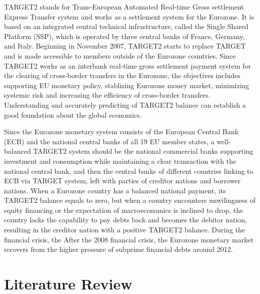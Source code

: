\documentclass[12pt]{article}
\begin{document}
TARGET2 stands for Trans-European Automated Real-time Gross settlement Express Transfer system and works as a settlement system for the Eurozone. It is based on an integrated central technical infrastructure, called the Single Shared Platform (SSP), which is operated by three central banks of France, Germany, and Italy. Beginning in November 2007, TARGET2 starts to replace TARGET and is made accessible to members outside of the Eurozone countries. Since TARGET2 works as an interbank real-time gross settlement payment system for the clearing of cross-border transfers in the Eurozone, the objectives includes supporting EU monetary policy, stablizing Eurozone money market, minimizing systemic risk and increasing the efficiency of cross-border transfers. Understanding and accurately predicting of TARGET2 balance can establish a good foundation about the global economics. 

Since the Eurozone monetary system consists of the European Central Bank (ECB) and the national central banks of all 19 EU member states, a well-balanced TARGET2 system should be the national commercial banks supporting investment and consumption while maintaining a clear transaction with the national central bank, and then the central banks of different countries linking to ECB via TARGET system, left with parties of creditor nations and borrower nations. When a Eurozone country has a balanced national payment, its TARGET2 balance equals to zero, but when a country encounters unwilingness of equity financing or the expectation of macroeconomics is inclined to drop, the country lacks the capability to pay debts back and becomes the debitor nation, resulting in the creditor nation with a positive TARGET2 balance. During the financial crisis, the After the 2008 financial crisis, the Eurozone monetary market recovers from the higher pressure of subprime financial debts around 2012. 

\section{Literature Review} \label{sec:literature}
\end{document}
